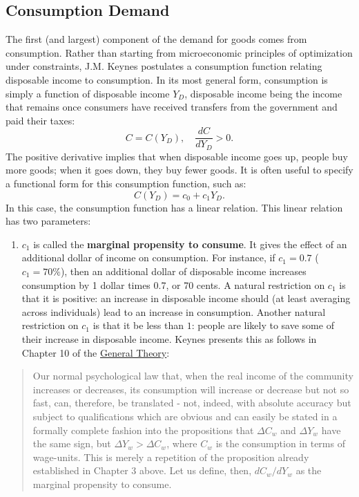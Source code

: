 \documentclass[]{book}
\providecommand{\tightlist}{%
  \setlength{\itemsep}{0pt}\setlength{\parskip}{0pt}}
\theoremstyle{definition}
\theoremstyle{definition}
\theoremstyle{definition}
\theoremstyle{remark}
\begin{document}
\subsection{Consumption Demand}\label{consumption-demand}

The first (and largest) component of the demand for goods comes from
consumption. Rather than starting from microeconomic principles of
optimization under constraints, J.M. Keynes postulates a consumption
function relating disposable income to consumption. In its most general
form, consumption is simply a function of disposable income \(Y_D\),
disposable income being the income that remains once consumers have
received transfers from the government and paid their taxes:
\[C=C(Y_D), \quad \frac{dC}{dY_D}>0.\] The positive derivative implies
that when disposable income goes up, people buy more goods; when it goes
down, they buy fewer goods. It is often useful to specify a functional
form for this consumption function, such as: \[C(Y_D)=c_0+c_1Y_D.\] In
this case, the consumption function has a linear relation. This linear
relation has two parameters:

\begin{enumerate}
\def\labelenumi{\arabic{enumi}.}
\tightlist
\item
  \(c_1\) is called the \textbf{marginal propensity to consume}. It
  gives the effect of an additional dollar of income on consumption. For
  instance, if \(c_1=0.7\) (\(c_1=70\%\)), then an additional dollar of
  disposable income increases consumption by 1 dollar times 0.7, or 70
  cents. A natural restriction on \(c_1\) is that it is positive: an
  increase in disposable income should (at least averaging across
  individuals) lead to an increase in consumption. Another natural
  restriction on \(c_1\) is that it be less than \(1\): people are
  likely to save some of their increase in disposable income. Keynes
  presents this as follows in Chapter 10 of the
  \href{http://cas2.umkc.edu/economics/people/facultypages/kregel/courses/econ645/winter2011/generaltheory.pdf}{General
  Theory}:
\end{enumerate}

\begin{quote}
Our normal psychological law that, when the real income of the community
increases or decreases, its consumption will increase or decrease but
not so fast, can, therefore, be translated - not, indeed, with absolute
accuracy but subject to qualifications which are obvious and can easily
be stated in a formally complete fashion into the propositions that
\(\Delta C_w\) and \(\Delta Y_w\) have the same sign, but
\(\Delta Y_w > \Delta C_w\), where \(C_w\) is the consumption in terms
of wage-units. This is merely a repetition of the proposition already
established in Chapter 3 above. Let us define, then, \(dC_w/dY_w\) as
the marginal propensity to consume.
\end{quote}
\end{document}
